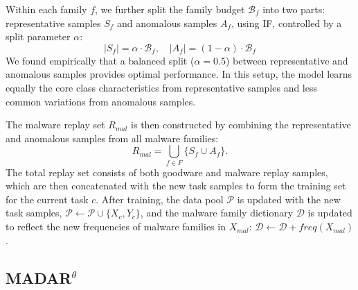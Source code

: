 Within each family $f$, we further split the family budget $\mathcal{B}_f$ into two parts: representative samples $S_f$ and anomalous samples $A_f$, using IF, controlled by a split parameter $\alpha$:
\begin{equation}
    |S_f| = \alpha \cdot \mathcal{B}_f, \quad |A_f| = (1 - \alpha) \cdot \mathcal{B}_f %
\end{equation}
%
We found empirically that a balanced split ($\alpha = 0.5$) between representative and anomalous samples provides optimal performance. In this setup, the model learns equally the core class characteristics from representative samples %
and less common variations from anomalous samples. 

The malware replay set $R_{mal}$ is then constructed by combining the representative and anomalous samples from all malware families: 
\begin{equation}
    R_{mal} = \bigcup_{f \in F} \{ S_f \cup A_f \}. %
\end{equation}
The total replay set consists of both goodware and malware replay samples, which are then concatenated with the new task samples
to form the training set for the current task $c$.
After training, the data pool $\mathcal{P}$ is updated with the new task samples, \(\mathcal{P} \leftarrow \mathcal{P} \cup \{X_c, Y_c\}\), and the malware family dictionary $\mathcal{D}$ is updated to reflect the new frequencies of malware families in $X_{mal}$: \(\mathcal{D} \leftarrow \mathcal{D} + freq(X_{mal})\).







\subsection{MADAR$^\theta$}
\label{subsec:aws}





